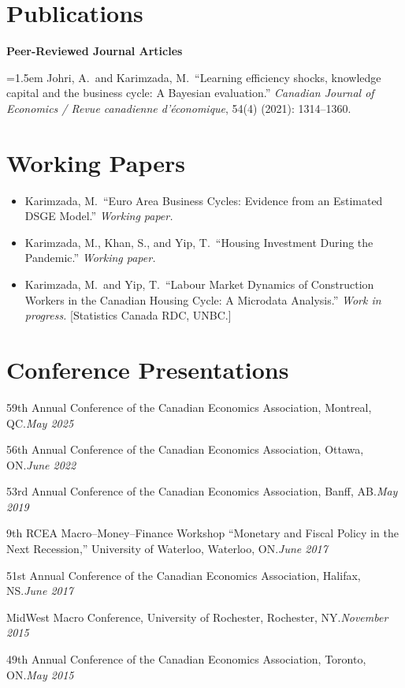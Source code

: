 \documentclass[11pt,letterpaper]{article}
\newcommand{\cvline}[2]{%
  \noindent\hangindent=0pt #2\hfill\textit{\small #1}\par
  \vspace{1pt}%
}
\begin{document}
\section{Publications}

\textbf{Peer-Reviewed Journal Articles}

\vspace{4pt}

\hangindent=1.5em
Johri, A.\ and Karimzada, M.\ ``Learning efficiency shocks, knowledge capital and the business cycle: A Bayesian evaluation.'' \textit{Canadian Journal of Economics / Revue canadienne d'\'economique}, 54(4) (2021): 1314--1360.

\section{Working Papers}

\begin{itemize}
  \item Karimzada, M.\ ``Euro Area Business Cycles: Evidence from an Estimated DSGE Model.'' \textit{Working paper.}

  \item Karimzada, M., Khan, S., and Yip, T.\ ``Housing Investment During the Pandemic.'' \textit{Working paper.}

  \item Karimzada, M.\ and Yip, T.\ ``Labour Market Dynamics of Construction Workers in the Canadian Housing Cycle: A Microdata Analysis.'' \textit{Work in progress.} [Statistics Canada RDC, UNBC.]
\end{itemize}

\section{Conference Presentations}

\cvline{May 2025}{59th Annual Conference of the Canadian Economics Association, Montreal, QC.}
\cvline{June 2022}{56th Annual Conference of the Canadian Economics Association, Ottawa, ON.}
\cvline{May 2019}{53rd Annual Conference of the Canadian Economics Association, Banff, AB.}
\cvline{June 2017}{9th RCEA Macro--Money--Finance Workshop ``Monetary and Fiscal Policy in the Next Recession,'' University of Waterloo, Waterloo, ON.}
\cvline{June 2017}{51st Annual Conference of the Canadian Economics Association, Halifax, NS.}
\cvline{November 2015}{MidWest Macro Conference, University of Rochester, Rochester, NY.}
\cvline{May 2015}{49th Annual Conference of the Canadian Economics Association, Toronto, ON.}
\end{document}
